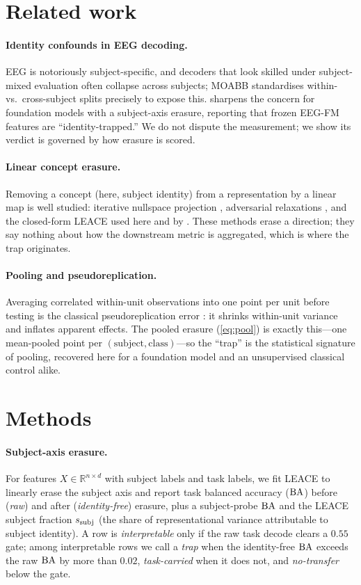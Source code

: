 \documentclass[11pt]{article}
\begin{document}
\section{Related work}
\paragraph{Identity confounds in EEG decoding.} EEG is notoriously subject-specific, and decoders
that look skilled under subject-mixed evaluation often collapse across subjects; MOABB
\citep{jayaram2018moabb} standardises within- vs.\ cross-subject splits precisely to expose this.
\fmscope{} \citep{fmscope} sharpens the concern for foundation models with a subject-axis erasure,
reporting that frozen EEG-FM features are ``identity-trapped.'' We do not dispute the measurement;
we show its verdict is governed by how erasure is scored.

\paragraph{Linear concept erasure.} Removing a concept (here, subject identity) from a representation
by a linear map is well studied: iterative nullspace projection \citep{ravfogel2020inlp}, adversarial
relaxations \citep{ravfogel2022rlace}, and the closed-form LEACE \citep{belrose2023leace} used here
and by \fmscope{}. These methods erase a direction; they say nothing about how the downstream metric
is aggregated, which is where the trap originates.

\paragraph{Pooling and pseudoreplication.} Averaging correlated within-unit observations into one
point per unit before testing is the classical pseudoreplication error \citep{hurlbert1984}: it
shrinks within-unit variance and inflates apparent effects. The pooled erasure
(\cref{eq:pool}) is exactly this---one mean-pooled point per $(\text{subject},\text{class})$---so the
``trap'' is the statistical signature of pooling, recovered here for a foundation model and an
unsupervised classical control alike.

\section{Methods}
\paragraph{Subject-axis erasure.} For features $X\in\mathbb{R}^{n\times d}$ with subject labels and
task labels, we fit LEACE to linearly erase the subject axis and report task balanced accuracy
($\mathrm{BA}$) before (\emph{raw}) and after (\emph{identity-free}) erasure, plus a subject-probe $\mathrm{BA}$ and
the LEACE subject fraction $s_{\mathrm{subj}}$ (the share of representational variance attributable to subject
identity). A row is \emph{interpretable} only if the raw task decode clears a $0.55$ gate; among
interpretable rows we call a \emph{trap} when the identity-free $\mathrm{BA}$ exceeds the raw $\mathrm{BA}$ by more
than $0.02$, \emph{task-carried} when it does not, and \emph{no-transfer} below the gate.
\end{document}
